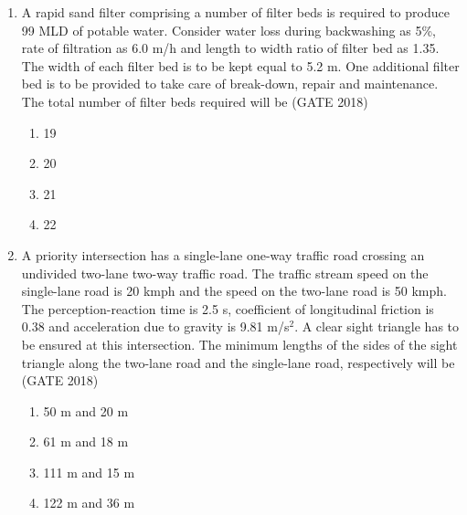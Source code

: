 \documentclass[journal,12pt,onecolumn]{IEEEtran}
\theoremstyle{remark}
\begin{document}
\begin{enumerate}
\item A rapid sand filter comprising a number of filter beds is required to produce 99 MLD of potable water. Consider water loss during backwashing as 5\%, rate of filtration as 6.0 m/h and length to width ratio of filter bed as 1.35. The width of each filter bed is to be kept equal to 5.2 m. One additional filter bed is to be provided to take care of break-down, repair and maintenance. The total number of filter beds required will be
\hfill{(GATE 2018)}
\begin{multicols}{4}
\begin{enumerate}
    \item 19
    \item 20
    \item 21
    \item 22
\end{enumerate}
\end{multicols}
\vspace{1cm}

\item A priority intersection has a single-lane one-way traffic road crossing an undivided two-lane two-way traffic road. The traffic stream speed on the single-lane road is 20 kmph and the speed on the two-lane road is 50 kmph. The perception-reaction time is 2.5 s, coefficient of longitudinal friction is 0.38 and acceleration due to gravity is 9.81 m/s$^2$. A clear sight triangle has to be ensured at this intersection. The minimum lengths of the sides of the sight triangle along the two-lane road and the single-lane road, respectively will be
\hfill{(GATE 2018)}
\begin{multicols}{4}
\begin{enumerate}
    \item 50 m and 20 m
    \item 61 m and 18 m
    \item 111 m and 15 m
    \item 122 m and 36 m
\end{enumerate}
\end{multicols}
\vspace{1cm}


\end{enumerate}
\end{document}
